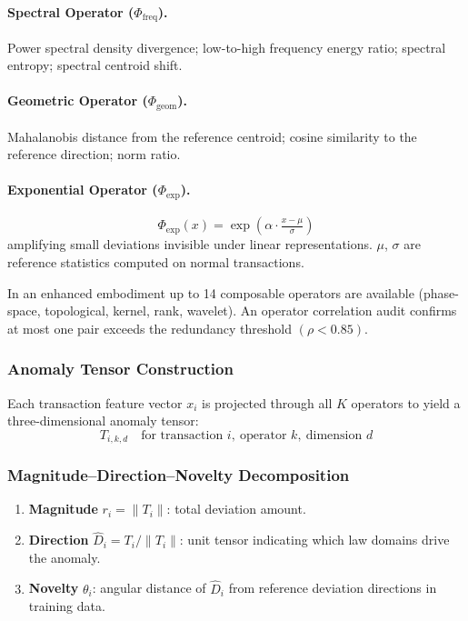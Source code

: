 \documentclass[12pt,a4paper]{article}
\begin{document}
\paragraph{Spectral Operator ($\Phi_{\mathrm{freq}}$).}
Power spectral density divergence; low-to-high frequency energy ratio;
spectral entropy; spectral centroid shift.

\paragraph{Geometric Operator ($\Phi_{\mathrm{geom}}$).}
Mahalanobis distance from the reference centroid; cosine similarity to
the reference direction; norm ratio.

\paragraph{Exponential Operator ($\Phi_{\mathrm{exp}}$).}
\begin{equation}
\Phi_{\mathrm{exp}}(x) = \exp\!\left(\alpha\cdot\tfrac{x-\mu}{\sigma}\right)
\end{equation}
amplifying small deviations invisible under linear representations.
$\mu$, $\sigma$ are reference statistics computed on normal transactions.

In an enhanced embodiment up to 14 composable operators are available
(phase-space, topological, kernel, rank, wavelet). An operator correlation
audit confirms at most one pair exceeds the redundancy threshold
$(\rho<0.85)$.

\subsubsection{Anomaly Tensor Construction}

Each transaction feature vector $x_i$ is projected through all $K$
operators to yield a three-dimensional anomaly tensor:
\begin{equation}
T_{i,k,d} \quad\text{for transaction }i,\ \text{operator }k,
\ \text{dimension }d
\end{equation}

\subsubsection{Magnitude--Direction--Novelty Decomposition}

\begin{enumerate}[label=(\alph*)]
\item \textbf{Magnitude} $r_i = \|T_i\|$: total deviation amount.
\item \textbf{Direction} $\hat{D}_i = T_i/\|T_i\|$: unit tensor
indicating which law domains drive the anomaly.
\item \textbf{Novelty} $\theta_i$: angular distance of $\hat{D}_i$ from
reference deviation directions in training data.
\end{enumerate}
\end{document}
